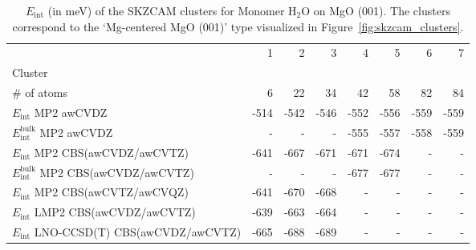 \begin{table}
\caption{\label{tab:system_eint_mgo_h2o_monomer}$E_\textrm{int}$ (in meV) of the SKZCAM clusters for Monomer H$_2$O on MgO (001). The clusters correspond to the `Mg-centered MgO (001)' type visualized in Figure~\ref{fig:skzcam_clusters}.}
\begin{adjustbox}{center,max width=1.4\textwidth}
\begin{tabular}{lrrrrrrr}
\toprule
 & 1 & 2 & 3 & 4 & 5 & 6 & 7 \\ 
Cluster &  &  &  &  &  &  &  \\
\midrule
\# of atoms & 6 & 22 & 34 & 42 & 58 & 82 & 84 \\
$E_\textrm{int}$ MP2 awCVDZ & -514 & -542 & -546 & -552 & -556 & -559 & -559 \\
$E_\textrm{int}^\textrm{bulk}$ MP2 awCVDZ & - & - & - & -555 & -557 & -558 & -559 \\
$E_\textrm{int}$ MP2 CBS(awCVDZ/awCVTZ) & -641 & -667 & -671 & -671 & -674 & - & - \\
$E_\textrm{int}^\textrm{bulk}$ MP2 CBS(awCVDZ/awCVTZ) & - & - & - & -677 & -677 & - & - \\
$E_\textrm{int}$ MP2 CBS(awCVTZ/awCVQZ) & -641 & -670 & -668 & - & - & - & - \\
$E_\textrm{int}$ LMP2 CBS(awCVDZ/awCVTZ) & -639 & -663 & -664 & - & - & - & - \\
$E_\textrm{int}$ LNO-CCSD(T) CBS(awCVDZ/awCVTZ) & -665 & -688 & -689 & - & - & - & - \\
\bottomrule
\end{tabular}
\end{adjustbox}
\end{table}

